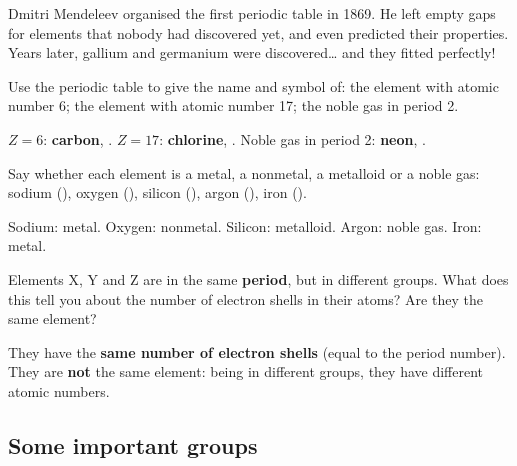 \begin{didyouknow}
    Dmitri Mendeleev organised the first periodic table in 1869. He left empty gaps for elements that nobody had discovered yet, and even predicted their properties. Years later, gallium and germanium were discovered\ldots{} and they fitted perfectly!
\end{didyouknow}

\begin{exercise}
    Use the periodic table to give the name and symbol of: the element with atomic number 6; the element with atomic number 17; the noble gas in period 2.
    \begin{solu}
        \(Z = 6\): \textbf{carbon}, . \quad \(Z = 17\): \textbf{chlorine}, . \quad Noble gas in period 2: \textbf{neon}, .
    \end{solu}
\end{exercise}

\begin{exercise}
    Say whether each element is a metal, a nonmetal, a metalloid or a noble gas: sodium (), oxygen (), silicon (), argon (), iron ().
    \begin{solu}
        Sodium: metal. Oxygen: nonmetal. Silicon: metalloid. Argon: noble gas. Iron: metal.
    \end{solu}
\end{exercise}

\begin{exercise}
    Elements X, Y and Z are in the same \textbf{period}, but in different groups. What does this tell you about the number of electron shells in their atoms? Are they the same element?
    \begin{solu}
        They have the \textbf{same number of electron shells} (equal to the period number). They are \textbf{not} the same element: being in different groups, they have different atomic numbers.
    \end{solu}
\end{exercise}

\subsection{Some important groups}

